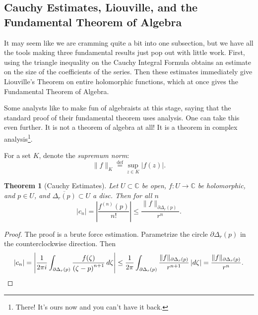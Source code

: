 \documentclass[12pt,openany]{book}
\newcommand{\sabs}[1]{\lvert {#1} \rvert}
\newcommand{\snorm}[1]{\lVert {#1} \rVert}
\newcommand{\abs}[1]{\left\lvert {#1} \right\rvert}
\newcommand{\C}{{\mathbb{C}}}
\newcommand{\myindex}[1]{#1\index{#1}}
\theoremstyle{plain}
\newtheorem{thm}{Theorem}[section]
\theoremstyle{remark}
\theoremstyle{definition}
\theoremstyle{exercise}
\theoremstyle{example}
\begin{document}
\subsection{Cauchy Estimates, Liouville, and the Fundamental Theorem of
Algebra}

It may seem like we are cramming quite a bit into one subsection, but
we have all the tools making three fundamental results just pop out
with little work.  First, using the triangle inequality on
the Cauchy Integral Formula obtains an estimate on the size of the
coefficients of the series.  Then these estimates immediately give
Liouville's Theorem on entire holomorphic functions, which at once gives the
Fundamental Theorem of Algebra.

Some analysts like to make fun of algebraists at this stage, saying that the
standard proof of their fundamental theorem uses analysis.
One can take this even further.
It is not a theorem of algebra at all!
It is a theorem in
complex analysis\footnote{There! It's ours now and you can't have it back.}.

For a set $K$, denote the \emph{\myindex{supremum norm}}:
%
\begin{equation*}
\snorm{f}_K
\overset{\text{def}}{=}
\sup_{z \in K} \sabs{f(z)} .
\end{equation*}

\begin{thm}[Cauchy Estimates]
Let $U \subset \C$ be open, $f \colon U \to \C$ be
holomorphic, and $p \in U$, and $\overline{\Delta_r(p)} \subset U$
a disc.
Then for all $n$
\begin{equation*}
\sabs{c_n} =
\abs{\frac{f^{(n)}(p)}{n!}}
\leq
\frac{\snorm{f}_{\partial \Delta_r(p)}}{r^{n}} .
\end{equation*}
\end{thm}

\begin{proof}
The proof is a brute force estimation.  Parametrize 
the circle $\partial \Delta_r(p)$ in the counterclockwise direction.  Then
\begin{equation*}
\sabs{c_n} = 
\abs{
\frac{1}{2\pi i}
\int_{\partial \Delta_r(p)}
\frac{f(\zeta)}{{(\zeta-p)}^{n+1}}
\,
d \zeta 
}
\leq
\frac{1}{2\pi}
\int_{\partial \Delta_r(p)}
\frac{\snorm{f}_{\partial \Delta_r(p)}}{r^{n+1}}
\,
\sabs{d \zeta} 
=
\frac{\snorm{f}_{\partial \Delta_r(p)}}{r^{n}} .
\qedhere
\end{equation*}
\end{proof}
\end{document}
